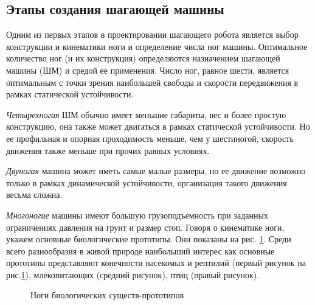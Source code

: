 \newpage
\subsection*{Этапы создания шагающей машины}
Одним из первых этапов в проектировании шагающего робота является выбор конструкции и кинематики ноги и определение числа ног машины. Оптимальное количество ног (и их конструкция) определяются назначением шагающей машины (ШМ) и средой ее применения. 
Число ног, равное шести, является оптимальным с точки зрения наибольшей свободы и скорости передвижения в рамках статической устойчивости. 

\emph{Четырехногая} ШМ обычно имеет меньшие габариты, вес и более простую конструкцию, она также может двигаться в рамках статической устойчивости. Но ее профильная и опорная проходимость меньше, чем у шестиногой, скорость движения также меньше при прочих равных условиях.

\emph{Двуногая} машина может иметь самые малые размеры, но ее движение возможно только в рамках динамической устойчивости, организация такого движения весьма сложна. 

\emph{Многоногие} машины имеют большую грузоподъемность при заданных ограничениях давления на грунт и размер стоп. 
Говоря о кинематике ноги, укажем основные биологические прототипы. Они показаны на рис. \ref{fig28}. Среди всего разнообразия в живой природе наибольший интерес как основные прототипы представляют конечности насекомых и рептилий (первый рисунок на рис.\ref{fig28}), млекопитающих (средний рисунок), птиц (правый рисунок).




\begin{figure}[here]
\caption{Ноги биологических существ-прототипов}
\label{fig28}
\end{figure}

